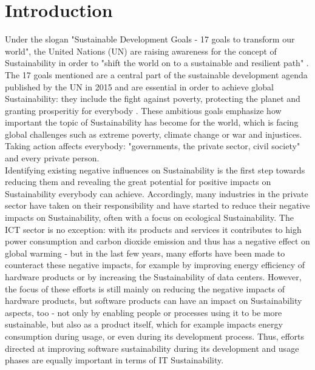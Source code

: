 \documentclass[oribibl]{llncs}
\begin{document}
\section{Introduction}
Under the slogan "Sustainable Development Goals - 17 goals to transform our world"\cite{nino_sustainable_2017}, the United Nations (UN) are raising awareness for the concept of Sustainability in order to "shift the world on to a sustainable and resilient path" \cite[p.\,1]{UN_transform_15}. The 17 goals mentioned are a central part of the sustainable development agenda published by the UN in 2015 \cite{UN_transform_15} and are essential in order to achieve global Sustainability: they include the fight against poverty, protecting the planet and granting prosperitiy for everybody \cite{nino_sustainable_2017}. These ambitious goals emphasize how important the topic of Sustainability has become for the world, which is facing global challenges such as extreme poverty, climate change or war and injustices. Taking action affects everybody: "governments, the private sector, civil society"\cite[p.\,1]{nino_sustainable_2017} and every private person.\\
Identifying existing negative influences on Sustainability is the first step towards reducing them and revealing the great potential for positive impacts on Sustainability everybody can achieve. Accordingly, many industries in the private sector  have taken on their responsibility and have started to reduce their negative impacts on Sustainability, often with a focus on ecological Sustainability. The ICT sector is no exception: with its products and services it contributes to high power consumption and carbon dioxide emission \cite{gartner07} and thus has a negative effect on global warming \cite{smart2020} - but in the last few years, many efforts have been made to counteract these negative impacts, for example by improving energy efficiency of hardware products or by increasing the Sustainability of data centers. %
However, the focus of these efforts is still mainly on reducing the negative impacts of hardware products, but software products can have an impact on Sustainability aspects, too - not only by enabling people or processes using it to be more sustainable, but also as a product itself, which for example impacts energy consumption during usage, or even during its development process. %
Thus, efforts directed at improving software sustainability during its development and usage phases are equally important in terms of IT Sustainability.\\
\end{document}
